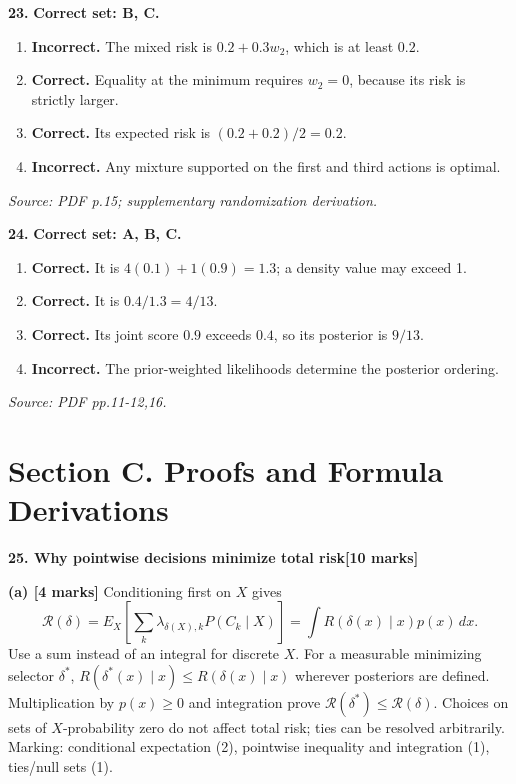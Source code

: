 \documentclass[11pt,a4paper]{article}
\begin{document}
\par\noindent\begin{minipage}{\linewidth}
\textbf{23.} \textbf{Correct set: B, C.}
\begin{enumerate}[label=(\Alph*),leftmargin=8mm,itemsep=2pt,topsep=2pt]
\item \textbf{Incorrect.} The mixed risk is \(0.2+0.3w_2\), which is at least \(0.2\).
\item \textbf{Correct.} Equality at the minimum requires \(w_2=0\), because its risk is strictly larger.
\item \textbf{Correct.} Its expected risk is \((0.2+0.2)/2=0.2\).
\item \textbf{Incorrect.} Any mixture supported on the first and third actions is optimal.
\end{enumerate}
{\footnotesize\textit{Source: PDF p.15; supplementary randomization derivation.}}

\end{minipage}\par\vspace{3mm}
\par\noindent\begin{minipage}{\linewidth}
\textbf{24.} \textbf{Correct set: A, B, C.}
\begin{enumerate}[label=(\Alph*),leftmargin=8mm,itemsep=2pt,topsep=2pt]
\item \textbf{Correct.} It is \(4(0.1)+1(0.9)=1.3\); a density value may exceed 1.
\item \textbf{Correct.} It is \(0.4/1.3=4/13\).
\item \textbf{Correct.} Its joint score \(0.9\) exceeds \(0.4\), so its posterior is \(9/13\).
\item \textbf{Incorrect.} The prior-weighted likelihoods determine the posterior ordering.
\end{enumerate}
{\footnotesize\textit{Source: PDF pp.11-12,16.}}

\end{minipage}\par\vspace{3mm}
\newpage\section*{Section C. Proofs and Formula Derivations}
\textbf{25. Why pointwise decisions minimize total risk}\hfill\textbf{[10 marks]}\par\medskip
\textbf{(a) [4 marks]} Conditioning first on \(X\) gives
\[
\mathcal R(\delta)=E_X\!\left[\sum_k\lambda_{\delta(X),k}P(C_k\mid X)\right]
=\int R(\delta(x)\mid x)p(x)\,dx.
\]
Use a sum instead of an integral for discrete \(X\). For a measurable minimizing selector \(\delta^*\), \(R(\delta^*(x)\mid x)\le R(\delta(x)\mid x)\) wherever posteriors are defined. Multiplication by \(p(x)\ge0\) and integration prove \(\mathcal R(\delta^*)\le\mathcal R(\delta)\). Choices on sets of \(X\)-probability zero do not affect total risk; ties can be resolved arbitrarily. Marking: conditional expectation (2), pointwise inequality and integration (1), ties/null sets (1).
\end{document}
